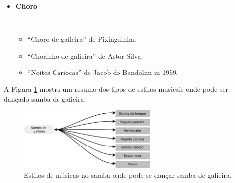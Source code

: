 \begin{itemize}
\item \textbf{Choro}
\begin{example} ~
\begin{itemize}
\item ``Choro de gafieira'' de Pixinguinha.
\item ``Chorinho de gafieira'' de Astor Silva.
\item ``Noites Cariocas'' de Jacob do Bandolim in 1959.
\end{itemize}
\end{example} 

\end{itemize}

A Figura \ref{fig:gafieiradancaestilos} mostra um resumo dos 
tipos de estilos musicais onde pode ser dançado samba de gafieira.
\begin{figure}[h]
  \centering
    \includegraphics[width=0.6\textwidth]{chapters/cap-historia-sambagafieira/gafieiravcmusica.eps}
  \caption{ Estilos de músicas no samba onde pode-se dançar samba de gafieira.}
\label{fig:gafieiradancaestilos}
\end{figure}

